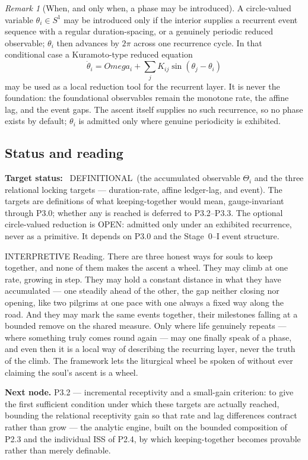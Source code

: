 \documentclass[11pt,a4paper]{article}
\def\Omega{Omega}%
\def\emph#1{#1}%
\newcommand{\stDef}{\textcolor{cDef}{\textsf{\small DEFINITIONAL}}}
\newcommand{\stInterp}{\textcolor{cInt}{\textsf{\small INTERPRETIVE}}}
\newcommand{\stOpen}{\textcolor{cOpn}{\textsf{\small OPEN}}}
\theoremstyle{definition}
\theoremstyle{plain}
\theoremstyle{remark}
\newtheorem{remark}[definition]{Remark}
\begin{document}
\begin{remark}[When, and only when, a phase may be introduced]\label{rem:s1}
A circle-valued variable \(\theta_i\in S^1\) may be introduced \emph{only} if the interior
supplies a recurrent event sequence with a regular duration-spacing, or a genuinely
periodic reduced observable; \(\theta_i\) then advances by \(2\pi\) across one recurrence
cycle. In that conditional case a Kuramoto-type reduced equation
\[
\dot\theta_i=\Omega_i+\sum_{j}K_{ij}\sin(\theta_j-\theta_i)
\]
may be used as a \emph{local reduction tool} for the recurrent layer. It is never the
foundation: the foundational observables remain the monotone rate, the affine lag, and the
event gaps. The ascent itself supplies no such recurrence, so no phase exists by default;
\(\theta_i\) is admitted only where genuine periodicity is exhibited.
\end{remark}

\subsection{Status and reading}

\textbf{Target status:}~
\stDef\ (the accumulated observable \(\Theta_i\) and the three relational locking
targets --- duration-rate, affine ledger-lag, and event). The targets are
definitions of what keeping-together would mean, gauge-invariant through P3.0;
whether any is reached is deferred to P3.2--P3.3. The optional circle-valued
reduction is \stOpen: admitted only under an exhibited recurrence, never as a
primitive. It depends on P3.0 and the Stage~0--I event structure.

\medskip
\stInterp\quad
\emph{Reading.}
There are three honest ways for souls to keep together, and none of them makes the ascent a
wheel. They may climb at one rate, growing in step. They may hold a constant distance in
what they have accumulated --- one steadily ahead of the other, the gap neither closing nor
opening, like two pilgrims at one pace with one always a fixed way along the road. And they
may mark the same events together, their milestones falling at a bounded remove on the
shared measure. Only where life genuinely repeats --- where something truly comes round
again --- may one finally speak of a phase, and even then it is a local way of describing the
recurring layer, never the truth of the climb. The framework lets the liturgical wheel be
spoken of without ever claiming the soul's ascent is a wheel.

\medskip
\textbf{Next node.} P3.2 --- incremental receptivity and a small-gain criterion: to give the
first sufficient condition under which these targets are actually reached, bounding the
relational receptivity gain so that rate and lag differences contract rather than grow ---
the analytic engine, built on the bounded composition of P2.3 and the individual ISS of
P2.4, by which keeping-together becomes provable rather than merely definable.
\end{document}
